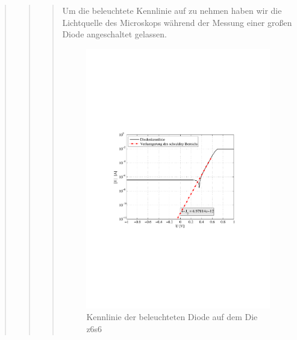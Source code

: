 \begin{quote}
\begin{quote}
\begin{quote}
            Um die beleuchtete Kennlinie auf zu nehmen haben wir die Lichtquelle des Microskops während der Messung
            einer großen Diode angeschaltet gelassen.
            
            \begin{figure}[H]
                \centering
                \includegraphics[scale=0.7, trim = 3.1cm 9.2cm 4cm 8.5cm, clip]{KennlinienBilder/beleuchtete_kennlinie_z7_s7.pdf}
                \caption{Kennlinie der beleuchteten Diode auf dem Die z6s6}
                \label{fig:beleuchtete_kennlinie_z7_s7.pdf}
            \end{figure}
            
        \end{quote} %
        


    \end{quote} %





\end{quote}
